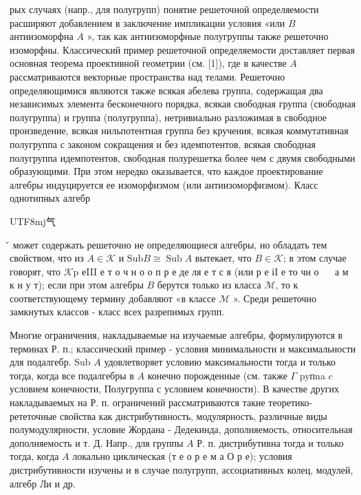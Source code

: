 \documentclass[10pt]{article}
\begin{document}
рых случаях (напр., для полугрупп) понятие решеточной определяемости расширяют добавлением в заключение импликации условия «или $B$ антиизоморфна $A$ », так как антиизоморфные полугруппы также решеточно изоморфны. Классический пример решеточной определяемости доставляет первая основная теорема проективной геометрии (см. [1]), где в качестве $A$ рассматриваются векторные пространства над телами. Решеточно определяющимися являются также всякая абелева группа, содержащая два независимых элемента бесконечного порядка, всякая свободная группа (свободная полугруппа) и группа (полугруппа), нетривиально разложимая в свободное произведение, всякая нильпотентная группа без кручения, всякая коммутативная полугруппа с законом сокращения и без идемпотентов, всякая свободная полугруппа идемпотентов, свободная полурешетка более чем с двумя свободными образующими. При этом нередко оказывается, что каждое проектирование алгебры индуцируется ее изоморфизмом (или антиизоморфизмом). Класс однотипных алгебр \begin{CJK}{UTF8}{mj}气\end{CJK}̌ может содержать решеточно не определяющиеся алгебры, но обладать тем свойством, что из $A \in \mathscr{\mathcal { K }}$ и $\mathrm{Sub} B \cong \operatorname{Sub} A$ вытекает, что $B \in \mathscr{K}$; в этом случае говорят, что $\mathscr{K} \mathrm{p}$ еIII е т о ч н о о п р е де ля е т с я (или р е іI е то чн о $\quad$ а м к н у т); если при этом алгебры $B$ берутся только из класса $\mathcal{M}$, то к соответствующему термину добавляют «в классе $\mathscr{M}$ ». Среди решеточно замкнутых классов - класс всех разрепимых групп.



Многие ограничения, накладываемые на изучаемые алгебры, формулируются в терминах Р. п.; классический пример - условия минимальности и максимальности для подалгебр. Sub $A$ удовлетворяет условию максимальности тогда и только тогда, когда все подалгебры в $A$ конечно порожденные (см. также $\Gamma$ pyпna $c$ условием конечности, Полугруппа с условием конечности). В качестве других накладываемых на Р. п. ограничений рассматриваются такие теоретико-рететочные свойства как дистрибутивность, модулярность, различные виды полумодулярности, условие Жордана - Дедекинда, дополняемость, относительная дополняемость и т. Д. Напр., для группы $A$ Р. п. дистрибутивна тогда и только тогда, когда $A$ локально циклическая (т е о р е м а О р е); условия дистрибутивности изучены и в случае полугрупп, ассоциативных колец, модулей, алгебр Ли и др.
\end{document}
